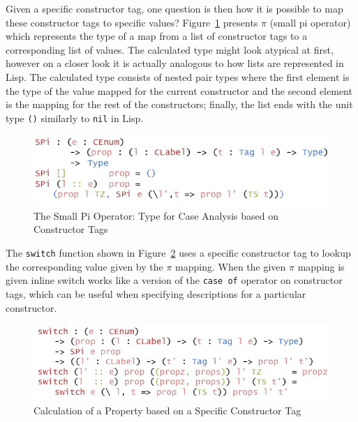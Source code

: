 \documentclass{ituthesis}
\begin{document}
Given a specific constructor tag, one question is then how it is possible to map these constructor tags to specific values? Figure~\ref{fig:smallpiop} presents $\pi$ (small pi operator) which represents
the type of a map from a list of constructor tags to a corresponding list of values.
The calculated type might look atypical at first, however on a closer look it is actually analogous to how lists are represented in Lisp.
The calculated type consists of nested pair types where the first element is the type of the value mapped for the current constructor
and the second element is the mapping for the rest of the constructors; finally, the list ends with the unit type \texttt{()} similarly to \texttt{nil} in Lisp.

\begin{figure}[ht]
\begin{center}
    \includegraphics[scale=0.5]{Figures/AConstructiveTypeofChoice.png}
\end{center}
\caption{The Small Pi Operator: Type for Case Analysis based on Constructor Tags}
\label{fig:smallpiop}
\end{figure}

The \texttt{switch} function shown in Figure~\ref{fig:switchctor} uses a specific constructor tag to lookup the corresponding value given by the $\pi$ mapping.
When the given $\pi$ mapping is given inline switch works like a version of the \texttt{case of} operator on constructor tags, which can be useful when specifying descriptions for a particular constructor.

\begin{figure}[ht]
\begin{center}
    \includegraphics[scale=0.5]{Figures/AConstructiveChoice.png}
\end{center}
\caption{Calculation of a Property based on a Specific Constructor Tag}
\label{fig:switchctor}
\end{figure}
\end{document}
